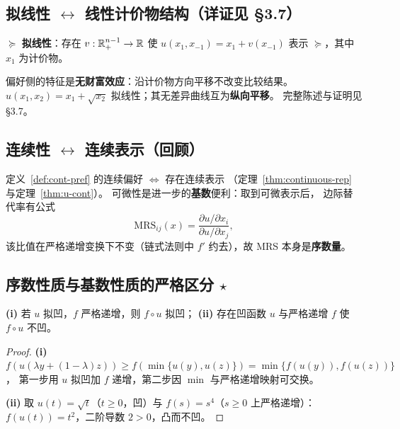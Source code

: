 \subsection{拟线性 $\leftrightarrow$ 线性计价物结构（详证见 \S 3.7）}

\begin{definition}[拟线性表示]\label{def:ql-rep}
$\succeq$ \textbf{拟线性}：存在 $v:\mathbb{R}_+^{n-1}\to\mathbb{R}$ 使
$u(x_1,x_{-1})=x_1+v(x_{-1})$ 表示 $\succeq$，其中 $x_1$ 为计价物。
\end{definition}

偏好侧的特征是\textbf{无财富效应}：沿计价物方向平移不改变比较结果。
$u(x_1,x_2)=x_1+\sqrt{x_2}$ 拟线性；其无差异曲线互为\textbf{纵向平移}。
完整陈述与证明见 §3.7。

\subsection{连续性 $\leftrightarrow$ 连续表示（回顾）}

定义~\ref{def:cont-pref} 的连续偏好 $\iff$ 存在连续表示
（定理~\ref{thm:continuous-rep} 与定理~\ref{thm:u-cont}）。
可微性是进一步的\textbf{基数}便利：取到可微表示后，
边际替代率有公式
\[
\mathrm{MRS}_{ij}(x)=\frac{\partial u/\partial x_i}{\partial u/\partial x_j},
\]
该比值在严格递增变换下不变（链式法则中 $f'$ 约去），故 MRS 本身是\textbf{序数量}。

\subsection{序数性质与基数性质的严格区分 \texorpdfstring{$\star$}{*}}\label{subsec:ordinal-cardinal}

\begin{proposition}\label{prop:qc-ordinal}
\textbf{(i)} 若 $u$ 拟凹，$f$ 严格递增，则 $f\circ u$ 拟凹；
\textbf{(ii)} 存在凹函数 $u$ 与严格递增 $f$ 使 $f\circ u$ 不凹。
\end{proposition}

\begin{proof}
\textbf{(i)} $f(u(\lambda y+(1-\lambda)z))\ge f(\min\{u(y),u(z)\})=\min\{f(u(y)),f(u(z))\}$，
第一步用 $u$ 拟凹加 $f$ 递增，第二步因 $\min$ 与严格递增映射可交换。

\textbf{(ii)} 取 $u(t)=\sqrt{t}$（$t\ge0$，凹）与 $f(s)=s^4$（$s\ge0$ 上严格递增）：
$f(u(t))=t^2$，二阶导数 $2>0$，凸而不凹。
\end{proof}


